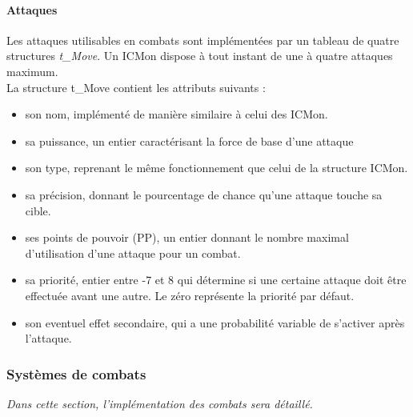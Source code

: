 \documentclass[12pt,a4paper, twoside]{article}
\begin{document}
        \paragraph{Attaques} Les attaques utilisables en combats sont implémentées par un tableau de quatre structures \emph{t\_Move}. Un ICMon dispose à tout instant de une à quatre attaques maximum.\\
        La structure t\_Move contient les attributs suivants :
        \begin{itemize}
            \item son nom, implémenté de manière similaire à celui des ICMon.
            \item sa puissance, un entier caractérisant la force de base d'une attaque
            \item son type, reprenant le même fonctionnement que celui de la structure ICMon.
            \item sa précision, donnant le pourcentage de chance qu'une attaque touche sa cible.
            \item ses points de pouvoir (PP), un entier donnant le nombre maximal d'utilisation d'une attaque pour un combat.
            \item sa priorité, entier entre -7 et 8 qui détermine si une certaine attaque doit être effectuée avant une autre. Le zéro représente la priorité par défaut.
            \item son eventuel effet secondaire, qui a une probabilité variable de s'activer après l'attaque.
        \end{itemize}  
    \subsubsection{Systèmes de combats}
        \emph{Dans cette section, l'implémentation des combats sera détaillé.}
\end{document}
